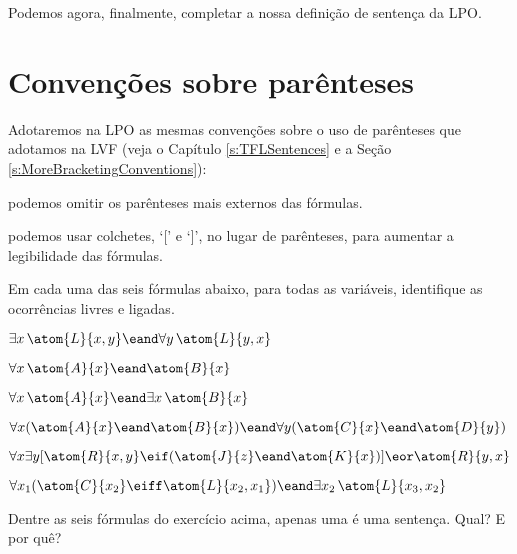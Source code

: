 Podemos agora, finalmente, completar a nossa definição de sentença da LPO.


\section{Convenções sobre parênteses}

Adotaremos na LPO as mesmas convenções sobre o uso de parênteses que adotamos na LVF (veja o Capítulo \ref{s:TFLSentences} e a Seção \ref{s:MoreBracketingConventions}):
\begin{ebullet}
	\item podemos omitir os parênteses mais externos das fórmulas.
	\item podemos usar colchetes, `[' e `]', no lugar de parênteses, para aumentar a legibilidade das fórmulas.
\end{ebullet}



\practiceproblems
\problempart
\label{pr.freeFOL}
Em cada uma das seis fórmulas abaixo, para todas as variáveis, identifique as ocorrências livres e ligadas.
\begin{earg}
\item $\exists x\, \atom{L}{x,y} \eand \forall y\, \atom{L}{y,x}$
\item $\forall x\, \atom{A}{x} \eand \atom{B}{x}$
\item $\forall x\, \atom{A}{x} \eand \exists x\, \atom{B}{x}$
\item $\forall x (\atom{A}{x} \eand \atom{B}{x}) \eand \forall y(\atom{C}{x} \eand \atom{D}{y})$
\item $\forall x\exists y[\atom{R}{x,y} \eif (\atom{J}{z} \eand \atom{K}{x})] \eor \atom{R}{y,x}$
\item $\forall x_1(\atom{C}{x_2} \eiff \atom{L}{x_2,x_1}) \eand \exists x_2\,\atom{L}{x_3,x_2}$
\end{earg}

\problempart
Dentre as seis fórmulas do exercício acima, apenas uma é uma sentença.
Qual? E por quê?
